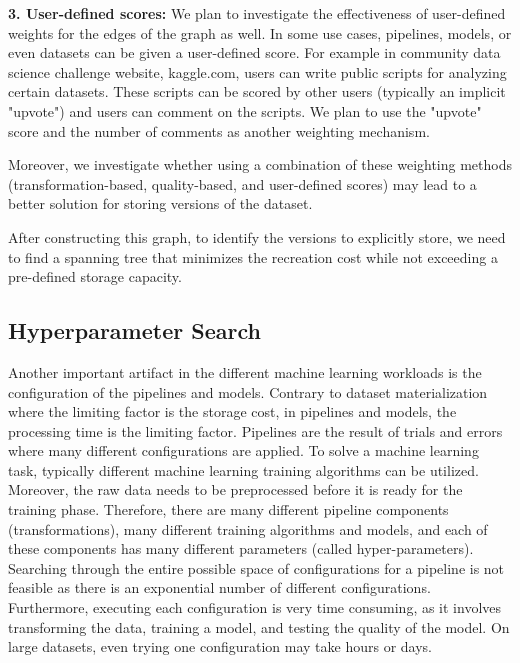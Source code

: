 \documentclass{sig-alternate-05-2015}
\begin{document}
\textbf{3. User-defined scores:}
We plan to investigate the effectiveness of user-defined weights for the edges of the graph as well.
In some use cases, pipelines, models, or even datasets can be given a user-defined score.
For example in community data science challenge website, kaggle.com, users can write public scripts for analyzing certain datasets.
These scripts can be scored by other users (typically an implicit "upvote") and users can comment on the scripts.
We plan to use the "upvote" score and the number of comments as another weighting mechanism.

Moreover, we investigate whether using a combination of these weighting methods (transformation-based, quality-based, and user-defined scores) may lead to a better solution for storing versions of the dataset.

After constructing this graph, to identify the versions to explicitly store, we need to find a spanning tree that minimizes the recreation cost while not exceeding a pre-defined storage capacity.

\subsection{Hyperparameter Search}
Another important artifact in the different machine learning workloads is the configuration of the pipelines and models.
Contrary to dataset materialization where the limiting factor is the storage cost, in pipelines and models, the processing time is the limiting factor.
Pipelines are the result of trials and errors where many different configurations are applied.
To solve a machine learning task, typically different machine learning training algorithms can be utilized.
Moreover, the raw data needs to be preprocessed before it is ready for the training phase.
Therefore, there are many different pipeline components (transformations), many different training algorithms and models, and each of these components has many different parameters (called hyper-parameters).
Searching through the entire possible space of configurations for a pipeline is not feasible as there is an exponential number of different configurations.
Furthermore, executing each configuration is very time consuming, as it involves transforming the data, training a model, and testing the quality of the model.
On large datasets, even trying one configuration may take hours or days.
\end{document}
